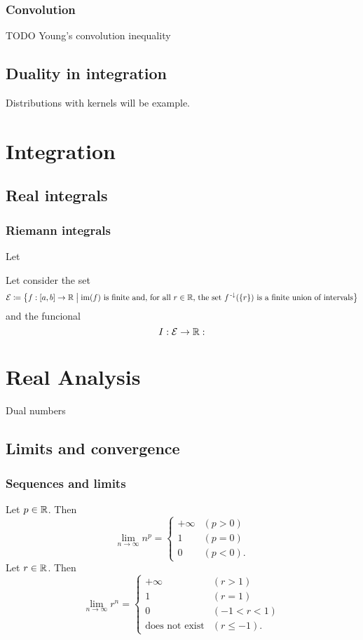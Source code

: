 \subsection{Convolution}
TODO Young's convolution inequality

\section{Duality in integration}
Distributions with kernels will be example.

\chapter{Integration}



\section{Real integrals}
\subsection{Riemann integrals}
\begin{definition}
Let
\end{definition}


\begin{definition}
Let consider the set
\[ \mathcal{E} \defeq \setbuilder{f: \interval{a,b}\to \R}{\text{$\im(f)$ is finite and, for all $r\in \R$, the set $f^\preimf(\{r\})$ is a finite union of intervals}} \]
and the funcional
\[ I : \mathcal{E} \to \mathbb{R}:  \]
\end{definition}






\chapter{Real Analysis}
Dual numbers

\section{Limits and convergence}
\subsection{Sequences and limits}
\begin{example}
Let $p\in\mathbb{R}$. Then
\[ \lim_{n\to\infty} n^p = \begin{cases}
+\infty & (p>0) \\
1 & (p=0) \\
0 & (p<0).
\end{cases} \]
Let $r\in\mathbb{R}$. Then
\[ \lim_{n\to\infty} r^n = \begin{cases}
+\infty & (r>1) \\
1 & (r=1) \\
0 & (-1<r<1) \\
\text{does not exist} & (r\leq -1).
\end{cases} \]
\end{example}


